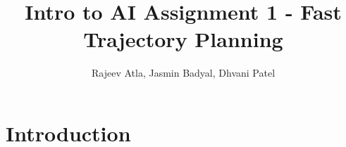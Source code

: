 \documentclass[12pt]{article}
\begin{document}
\title{Intro to AI Assignment 1 - Fast Trajectory Planning}
\author{Rajeev Atla, Jasmin Badyal, Dhvani Patel}
\maketitle




\section{Introduction}
\end{document}
